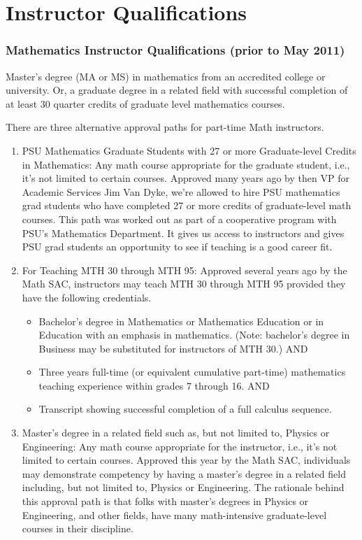 \chapter{Instructor Qualifications}\label{app:sec:instructorquals}
\subsection{Mathematics Instructor Qualifications (prior to May 2011)}
Master's degree (MA or MS) in mathematics from an accredited college or university.  Or, a graduate degree in a related field with successful completion of at least 30 quarter credits of graduate level mathematics courses.

There are three alternative approval paths for part-time Math instructors.
\begin{enumerate}
  \item PSU Mathematics Graduate Students with 27 or more Graduate-level Credits in Mathematics: Any math course appropriate for the graduate student, i.e., it's not limited to certain courses. Approved many years ago by then VP for Academic Services Jim Van Dyke, we're allowed to hire PSU mathematics grad students who have completed 27 or more credits of graduate-level math courses. This path was worked out as part of a cooperative program with PSU's Mathematics Department. It gives us access to instructors and gives PSU grad students an opportunity to see if teaching is a good career fit.
  \item For Teaching MTH 30 through MTH 95: Approved several years ago by the Math SAC, instructors may teach MTH 30 through MTH 95 provided they have the following credentials.
    \begin{itemize}
      \item Bachelor's degree in Mathematics or Mathematics Education or in Education with an emphasis in mathematics. (Note: bachelor's degree in Business may be substituted for instructors of MTH 30.)
        AND
      \item Three years full-time (or equivalent cumulative part-time) mathematics teaching experience within grades 7 through 16.
        AND
      \item Transcript showing successful completion of a full calculus sequence.
    \end{itemize}
  \item Master's degree in a related field such as, but not limited to, Physics or Engineering: Any math course appropriate for the instructor, i.e., it's not limited to certain courses. Approved this year by the Math SAC, individuals may demonstrate competency by having a master's degree in a related field including, but not limited to, Physics or Engineering. The rationale behind this approval path is that folks with master's degrees in Physics or Engineering, and other fields, have many math-intensive graduate-level courses in their discipline.
\end{enumerate}

